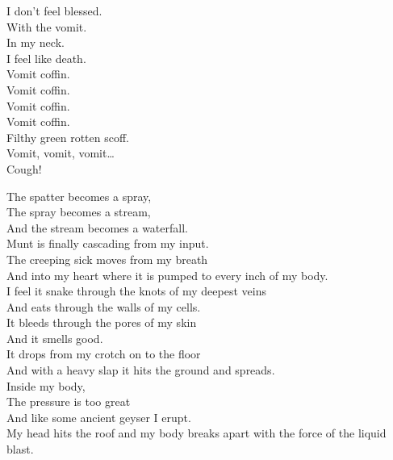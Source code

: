 
I don't feel blessed. \\
With the vomit. \\
In my neck. \\
I feel like death. \\

Vomit coffin. \\
Vomit coffin. \\
Vomit coffin. \\
Vomit coffin. \\

Filthy green rotten scoff. \\

Vomit, vomit, vomit… \\
Cough! \\





The spatter becomes a spray, \\
The spray becomes a stream, \\
And the stream becomes a waterfall. \\
Munt is finally cascading from my input. \\

The creeping sick moves from my breath \\
And into my heart where it is pumped to every inch of my body. \\
I feel it snake through the knots of my deepest veins \\
And eats through the walls of my cells. \\

It bleeds through the pores of my skin \\
And it smells good. \\
It drops from my crotch on to the floor \\
And with a heavy slap it hits the ground and spreads. \\

Inside my body, \\
The pressure is too great \\
And like some ancient geyser I erupt. \\
My head hits the roof and my body breaks apart with the force of the liquid blast. \\

